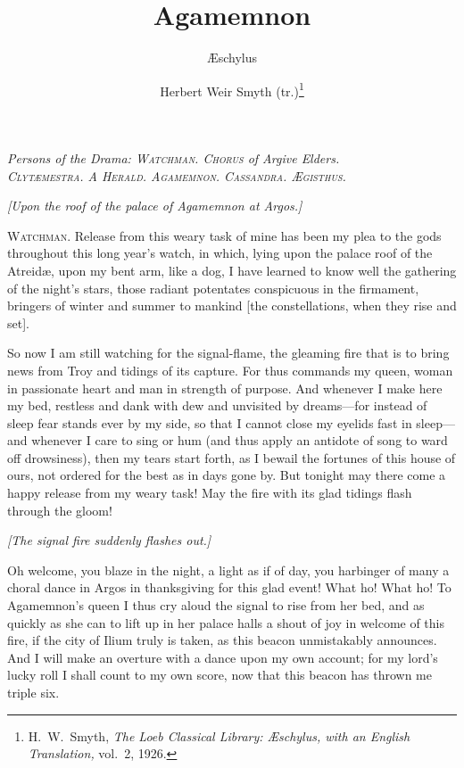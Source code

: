\documentclass[12pt]{article}
\title{Agamemnon}
\author{{\AE}schylus \and Herbert Weir Smyth (tr.)\footnote{H.~W.~Smyth, \textit{The Loeb Classical Library: {\AE}schylus, with an English Translation,} vol.~2, 1926.}}
\date{}
\begin{document}
\maketitle

\begin{center}
\textit{Persons of the Drama: \textsc{Watchman. Chorus} of Argive Elders.\\
\textsc{Clyt{\ae}mestra.} A \textsc{Herald. Agamemnon. Cassandra. {\AE}gisthus.}}
\end{center}

\begin{center}
\textit{[Upon the roof of the palace of Agamemnon at Argos.]}
\end{center}

\noindent \textsc{Watchman.} Release from this weary task of mine has been my plea to the gods throughout this long year's watch, in which, lying upon the palace roof of the Atreid{\ae}, upon my bent arm, like a dog, I have learned to know well the gathering of the night's stars, those radiant potentates conspicuous in the firmament, bringers of winter and summer to mankind [the constellations, when they rise and set].

So now I am still watching for the signal-flame, the gleaming fire that is to bring news from Troy and tidings of its capture. For thus commands my queen, woman in passionate heart and man in strength of purpose. And whenever I make here my bed, restless and dank with dew and unvisited by dreams---for instead of sleep fear stands ever by my side, so that I cannot close my eyelids fast in sleep---and whenever I care to sing or hum (and thus apply an antidote of song to ward off drowsiness), then my tears start forth, as I bewail the fortunes of this house of ours, not ordered for the best as in days gone by. But tonight may there come a happy release from my weary task! May the fire with its glad tidings flash through the gloom!

\begin{center}
\textit{[The signal fire suddenly flashes out.]}
\end{center}

Oh welcome, you blaze in the night, a light as if of day, you harbinger of many a choral dance in Argos in thanksgiving for this glad event! What ho! What ho! To Agamemnon's queen I thus cry aloud the signal to rise from her bed, and as quickly as she can to lift up in her palace halls a shout of joy in welcome of this fire, if the city of Ilium truly is taken, as this beacon unmistakably announces. And I will make an overture with a dance upon my own account; for my lord's lucky roll I shall count to my own score, now that this beacon has thrown me triple six.
\end{document}
